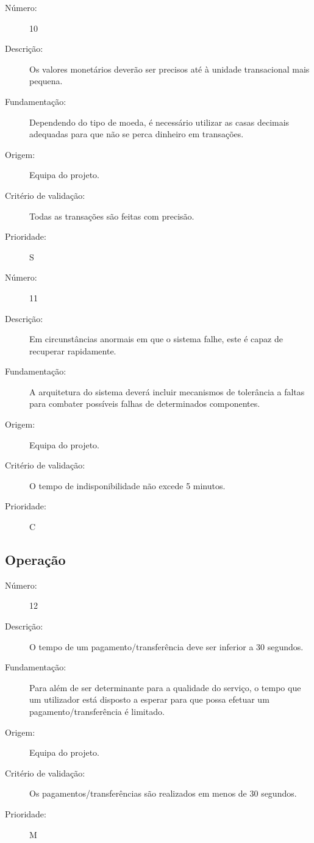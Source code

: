 \documentclass[12pt,a4paper]{article}
\begin{document}
            \begin{description}
        \item[Número:]10
        \item[Descrição:]Os valores monetários deverão ser precisos até à unidade transacional mais pequena.
        \item[Fundamentação:] Dependendo do tipo de moeda, é necessário utilizar as casas decimais adequadas para que não se perca dinheiro em transações.
        \item[Origem:]Equipa do projeto.
        \item[Critério de validação:]Todas as transações são feitas com precisão.
        \item[Prioridade:]S
      \end{description}
      \vspace{0.5cm}

            \begin{description}
        \item[Número:]11
        \item[Descrição:]Em circunstâncias anormais em que o sistema falhe, este é capaz de recuperar rapidamente.
        \item[Fundamentação:]A arquitetura do sistema deverá incluir mecanismos de tolerância a faltas para combater possíveis falhas de determinados componentes. 
        \item[Origem:]Equipa do projeto.
        \item[Critério de validação:]O tempo de indisponibilidade não excede 5 minutos.
        \item[Prioridade:]C
      \end{description}

  \subsection{Operação}

            \begin{description}
        \item[Número:]12
        \item[Descrição:]O tempo de um pagamento/transferência deve ser inferior a 30 segundos.
        \item[Fundamentação:]Para além de ser determinante para a qualidade do serviço, o tempo que um utilizador está disposto a esperar para que possa efetuar um pagamento/transferência é limitado.
        \item[Origem:]Equipa do projeto.
        \item[Critério de validação:]Os pagamentos/transferências são realizados em menos de 30 segundos.
        \item[Prioridade:]M
      \end{description}
      \vspace{0.5cm}
\end{document}
